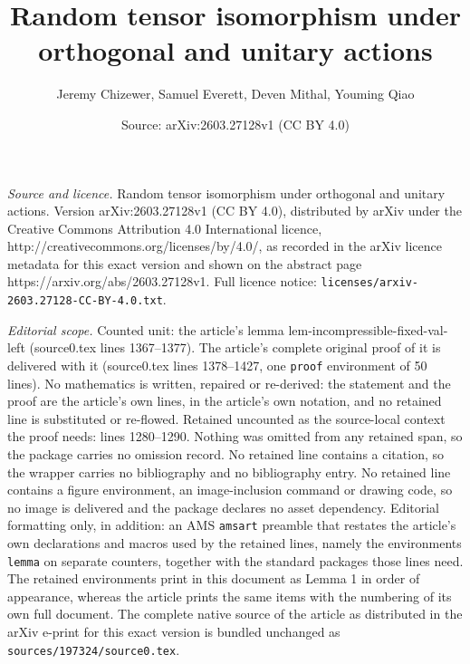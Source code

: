 \documentclass[10pt,a4paper]{amsart}
\title{Random tensor isomorphism under orthogonal and unitary actions}
\author{Jeremy Chizewer, Samuel Everett, Deven Mithal, Youming Qiao}
\date{Source: arXiv:2603.27128v1 (CC BY 4.0)}
\begin{document}
\maketitle

\noindent\emph{Source and licence.} Random tensor isomorphism under orthogonal and unitary actions. Version arXiv:2603.27128v1 (CC BY 4.0), distributed by arXiv under the Creative Commons Attribution 4.0 International licence, http://creativecommons.org/licenses/by/4.0/, as recorded in the arXiv licence metadata for this exact version and shown on the abstract page https://arxiv.org/abs/2603.27128v1. Full licence notice: \texttt{licenses/arxiv-2603.27128-CC-BY-4.0.txt}.\par\smallskip

\noindent\textit{Editorial scope.} Counted unit: the article's lemma lem-incompressible-fixed-val-left (source0.tex lines 1367--1377). The article's complete original proof of it is delivered with it (source0.tex lines 1378--1427, one \texttt{proof} environment of 50 lines). No mathematics is written, repaired or re-derived: the statement and the proof are the article's own lines, in the article's own notation, and no retained line is substituted or re-flowed.  Retained uncounted as the source-local context the proof needs: lines 1280--1290.  Nothing was omitted from any retained span, so the package carries no omission record.  No retained line contains a citation, so the wrapper carries no bibliography and no bibliography entry.  No retained line contains a figure environment, an image-inclusion command or drawing code, so no image is delivered and the package declares no asset dependency.  Editorial formatting only, in addition: an AMS \texttt{amsart} preamble that restates the article's own declarations and macros used by the retained lines, namely the environments \texttt{lemma} on separate counters, together with the standard packages those lines need.  The retained environments print in this document as Lemma 1 in order of appearance, whereas the article prints the same items with the numbering of its own full document.  The complete native source of the article as distributed in the arXiv e-print for this exact version is bundled unchanged as \texttt{sources/197324/source0.tex}.
\end{document}
